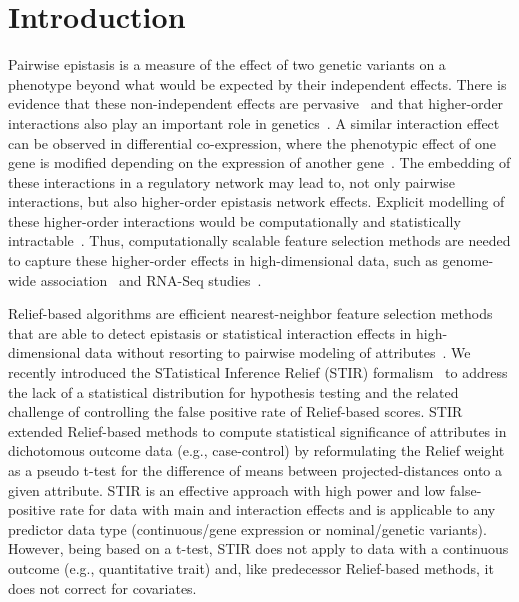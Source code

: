 \documentclass{bioinfo}
\begin{document}
\maketitle

\newpage

\section{Introduction}

Pairwise epistasis is a measure of the effect of two genetic variants on a phenotype beyond what would be expected by their independent effects.
There is evidence that these non-independent effects are pervasive~\citep{breen12} and that higher-order interactions also play an important role in genetics~\citep{weinreich13}.
A similar interaction effect can be observed in differential co-expression, where the phenotypic effect of one gene is modified depending on the expression of another gene~\citep{lareau15,diffcoexp10}.
The embedding of these interactions in a regulatory network may lead to, not only pairwise interactions, but also higher-order epistasis network effects.
Explicit modelling of these higher-order interactions would be computationally and statistically intractable~\citep{riesselman18}.
Thus, computationally scalable feature selection methods are needed to capture these higher-order effects in high-dimensional data, such as genome-wide association~\citep{titv} and RNA-Seq studies~\citep{stir}.

Relief-based algorithms are efficient nearest-neighbor feature selection methods that are able to detect epistasis or statistical interaction effects in high-dimensional data without resorting to pairwise modeling of attributes~\citep{urbanowicz17b, kononenko97, mckinney09, robnik03}.
We recently introduced the STatistical Inference Relief (STIR) formalism~\citep{stir} to address the lack of a statistical distribution for hypothesis testing and the related challenge of controlling the false positive rate of Relief-based scores.
STIR extended Relief-based methods to compute statistical significance of attributes in dichotomous outcome data (e.g., case-control) by reformulating the Relief weight~\citep{mckinney13} as a pseudo t-test for the difference of means between projected-distances onto a given attribute.
STIR is an effective approach with high power and low false-positive rate for data with main and interaction effects and is applicable to any predictor data type (continuous/gene expression or nominal/genetic variants).
However, being based on a t-test, STIR does not apply to data with a continuous outcome (e.g., quantitative trait) and, like predecessor Relief-based methods, it does not correct for covariates.
\end{document}
